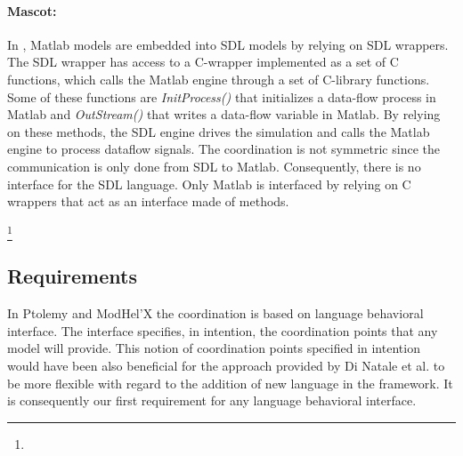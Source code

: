  
{\color{red}\paragraph{Mascot: }
In \cite{mascotbib}, Matlab models are embedded into SDL models by relying on SDL wrappers. The SDL wrapper has access to a C-wrapper implemented as a set of C functions, which calls the Matlab engine through a set of C-library functions. Some of these functions are \emph{InitProcess()} that initializes a data-flow process in Matlab and \emph{OutStream()} that writes a data-flow variable in Matlab. By relying on these methods, the SDL engine drives the simulation and calls the Matlab engine to process dataflow signals. The coordination is not symmetric since the communication is only done from SDL to Matlab. Consequently, there is no interface for the SDL language. Only Matlab is interfaced by relying on C wrappers that act as an interface made of methods.}\footnote{}



\subsection{Requirements}

In Ptolemy and ModHel'X the coordination is based on language behavioral interface. The interface specifies, in intention, the coordination points that any model will provide. This notion of coordination points specified in intention would have been also beneficial for the approach provided by Di Natale et al. to be more flexible with regard to the addition of new language in the framework. It is consequently our first requirement for any language behavioral interface.

%
%
%

